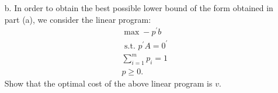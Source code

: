 \documentclass{article}
\begin{document}
\begin{jacklist}
\begin{framed}
\begin{itemize}
            \item [b.] In order to obtain the best possible lower bound of the form obtained in part (a), we consider the linear program:
                \begin{align*}
                    \max -p^{\prime} b \\
                    \text { s.t. } p^{\prime} A=0^{\prime} \\
                    \sum_{i=1}^{m} p_{i}=1 \\
                    p \geq 0.
                \end{align*} 
                Show that the optimal cost of the above linear program is $v$.
        \end{itemize}
    \end{framed}
\end{jacklist}
\end{document}
